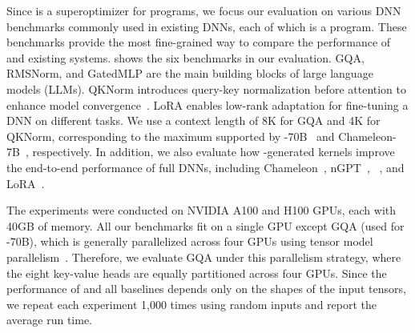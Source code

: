 Since \sys is a superoptimizer for \lax programs, we focus our evaluation on various DNN benchmarks commonly used in existing DNNs, each of which is a \lax program.
These benchmarks provide the most fine-grained way to compare the performance of \sys and existing systems.
 shows the six benchmarks in our evaluation.
GQA, RMSNorm, and GatedMLP are the main building blocks of large language models (LLMs).
%
QKNorm introduces query-key normalization before attention to enhance model convergence~\cite{chameleonteam2024chameleon}.
LoRA enables low-rank adaptation for fine-tuning a DNN on different tasks.
We use a context length of 8K for GQA and 4K for QKNorm, corresponding to the maximum supported by -70B~\cite{grattafiori2024llama3herdmodels} and Chameleon-7B~\cite{chameleonteam2024chameleon}, respectively.
In addition, we also evaluate how \sys-generated kernels improve the end-to-end performance of full DNNs, including Chameleon~\cite{chameleonteam2024chameleon}, nGPT~\cite{loshchilov2024ngpt}, ~\cite{grattafiori2024llama3herdmodels}, and LoRA~\cite{hu2021lora}.

%
%

%
The experiments were conducted on NVIDIA A100 and H100 GPUs, each with 40GB of memory.
All our benchmarks fit on a single GPU except GQA (used for -70B), which is generally parallelized across four GPUs using tensor model parallelism~\cite{Megatron}.
%
Therefore, we evaluate GQA under this parallelism strategy, where the eight key-value heads are equally partitioned across four GPUs.
Since the performance of \sys and all baselines depends only on the shapes of the input tensors, we repeat each experiment 1,000 times using random inputs and report the average run time. %

